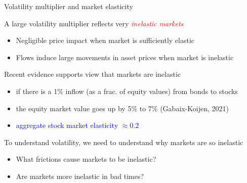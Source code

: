 \begin{frame}{Volatility multiplier and market elasticity}
    \begin{wideitemize}
      \item A large volatility multiplier reflects very \textcolor{red}{\textit{inelastic markets}} \vspM
      \begin{itemize}		
      	\item Negligible price impact when market is sufficiently elastic
      	\item Flows induce large movements in asset prices when market is inelastic
      \end{itemize}
		
		\item Recent evidence supports view that markets are inelastic
		\begin{itemize}
            \item if there is a 1\% inflow {\scriptsize(as a frac. of equity values)} from bonds to stocks\vspM
            \item the equity market value goes up by 5\% to 7\% {\scriptsize(Gabaix-Koijen, 2021)}
            \item \textcolor{blue}{aggregate stock market elasticity $ \approx 0.2 $}
        \end{itemize}
    	\item To understand volatility, we need to understand why  markets are so inelastic\vspM
    	\begin{itemize}
    		\item What frictions cause markets to be inelastic?
    		\item Are markets more inelastic in bad times?
    	\end{itemize}

      \end{wideitemize}
\end{frame}

